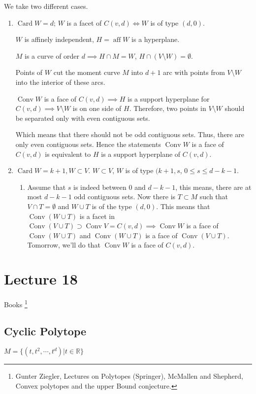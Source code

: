 \documentclass[11pt]{article}
\def\R{\mathbb{R}}
\def\aff{\operatorname{aff}}
\def\conv{\operatorname{Conv}}
\def\card{\operatorname{Card}}
\begin{document}
{{We take two different cases.

\begin{enumerate}
\item \(\card W = d\); \(W\) is a facet of \(C(v, d) \iff W\) is of type \((d, 0)\).

\(W\) is affinely independent, \(H = \aff W\) is a hyperplane.

\(M\) is a curve of order \(d \implies H \cap M = W\), \(H \cap (V \setminus
       W) = \emptyset\).

Points of \(W\) cut the moment curve \(M\) into \(d+1\) arc with points from \(V
       \setminus W\) into the interior of these arcs.

\(\conv W\) is a face of \(C(v, d) \implies H\) is a support hyperplane for
\(C(v, d) \implies V \setminus W\) is on one side of \(H\). Therefore, two
points in \(V \setminus W\) should be separated only with even contiguous
sets.

Which means that there should not be odd contiguous sets. Thus, there are
only even contiguous sets. Hence the statements \(\conv W\) is a face of
\(C(v, d)\) is equivalent to \(H\) is a support hyperplane of \(C(v, d)\).
\item \(\card W = k+1, W \subset V\). \(W \subset V\), \(W\) is of type \((k+1, s\), \(0
       \le s \le d-k-1\).

\begin{enumerate}
\item Assume that \(s\) is indeed between \(0\) and \(d - k - 1\), this means,
there are at most \(d-k-1\) odd contiguous sets. Now there is \(T \subset
          M\) such that \(V \cap T = \emptyset\) and \(W \cup T\) is of the type \((d,
          0)\). This means that \(\conv (W \cup T)\) is a facet in \(\conv (V \cup
          T) \supset \conv V = C(v, d) \implies \conv W\) is a face of \(\conv (W
          \cup T)\) and \(\conv(W \cup T)\) is a face of \(\conv (V \cup T)\).
Tomorrow, we'll do that \(\conv W\) is a face of \(C(v, d)\).
\end{enumerate}
\end{enumerate}
\section{Lecture 18}
\label{sec:org1c9ca13}
Books \footnote{Gunter Ziegler, Lectures on Polytopes (Springer), McMallen and Shepherd,
Convex polytopes and the upper Bound conjecture.}
\subsection{Cyclic Polytope}
\label{sec:org49ee8b8}
\(M = \{(t, t^2, \cdots, t^{d}) \vert t \in \R\}\)

}}
\end{document}
